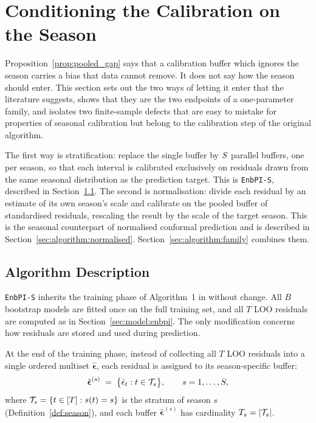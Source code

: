 \section{Conditioning the Calibration on the Season}
\label{sec:algorithm}

Proposition~\ref{prop:pooled_gap} says that a calibration buffer which
ignores the season carries a bias that data cannot remove.  It does not
say how the season should enter.  This section sets out the two ways of
letting it enter that the literature suggests, shows that they are the
two endpoints of a one-parameter family, and isolates two finite-sample
defects that are easy to mistake for properties of seasonal calibration
but belong to the calibration step of the original algorithm.

The first way is stratification: replace the single buffer by $S$
parallel buffers, one per season, so that each interval is calibrated
exclusively on residuals drawn from the same seasonal distribution as
the prediction target.  This is \texttt{EnbPI-S}, described in
Section~\ref{sec:algorithm:description}.  The second is normalisation:
divide each residual by an estimate of its own season's scale and
calibrate on the pooled buffer of standardised residuals, rescaling the
result by the scale of the target season.  This is the seasonal
counterpart of normalised conformal prediction
\citep{dewolf2025conditional} and is described in
Section~\ref{sec:algorithm:normalised}.  Section~\ref{sec:algorithm:family}
combines them.

\subsection{Algorithm Description}
\label{sec:algorithm:description}

\texttt{EnbPI-S} inherits the training phase of Algorithm~1 in
\citet{xu2023conformal} without change.  All $B$ bootstrap models are
fitted once on the full training set, and all $T$ LOO residuals are
computed as in Section~\ref{sec:model:enbpi}.  The only modification
concerns how residuals are stored and used during prediction.

At the end of the training phase, instead of collecting all $T$ LOO
residuals into a single ordered multiset $\hat{\boldsymbol\epsilon}$,
each residual is assigned to its season-specific buffer:
\[
  \hat{\boldsymbol\epsilon}^{(s)}
  \;=\;
  \bigl\{\hat{\epsilon}_t : t \in \mathcal{T}_s\bigr\},
  \qquad s = 1, \ldots, S,
\]
where $\mathcal{T}_s = \{t \in [T]: s(t) = s\}$ is the stratum of
season $s$ (Definition~\ref{def:season}), and each buffer
$\hat{\boldsymbol\epsilon}^{(s)}$ has cardinality
$T_s = |\mathcal{T}_s|$.

